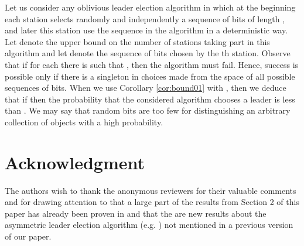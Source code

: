 \documentclass[proceedings]{dmtcs}
\begin{document}
Let us consider any oblivious leader election algorithm in which at the beginning each station selects randomly and independently
a sequence of bits of length , and later this station use the sequence 
in the algorithm in a deterministic way. 
Let  denote the upper bound on the number of stations taking part in this algorithm 
and let  denote the sequence of bits chosen by the th station.
Observe that if for each  there is  such that , then the algorithm must fail. 
Hence, success is possible only if there is a singleton  in choices made from the space  
of all possible sequences of bits. When we use Corollary \ref{cor:bound01} with , then we deduce
that if  then the probability that the considered algorithm
chooses a leader is less than  . We may say that  random bits are too few for distinguishing 
an arbitrary collection of  objects with a high probability.  

\section*{Acknowledgment}
The authors wish to thank the anonymous reviewers for their valuable comments and for drawing attention to that a large part of the results from Section 2 of this paper has already been proven in \cite{kirschenhofer1996} and that the are new results about the asymmetric leader election algorithm (e.g. \cite{GLandHP2009}) not mentioned in a previous version of our paper.
 


\label{lastpage}
\end{document}
